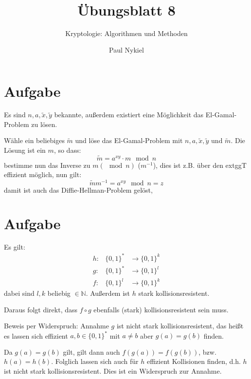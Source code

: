 \documentclass[DIN, pagenumber=false, fontsize=11pt, parskip=half]{scrartcl}
\title{Übungsblatt 8}
\subtitle{Kryptologie: Algorithmen und Methoden}
\author{Paul Nykiel}
\begin{document}
    \maketitle
    \section{Aufgabe}
    Es sind $n, a, \tilde{x}, \tilde{y}$ bekannte, außerdem existiert eine
    Möglichkeit das El-Gamal-Problem zu lösen.

    Wähle ein beliebiges $\tilde{m}$ und löse das El-Gamal-Problem mit
    $n, a, \tilde{x}, \tilde{y}$ und $\tilde{m}$. Die Lösung ist ein $m$, so
    dass:
    \begin{equation}
        \tilde{m} = a^{x y} \cdot m \mod n
    \end{equation}
    bestimme nun das Inverse zu $m (\mod n)$ ($m^{-1}$), dies ist z.B. über den extggT effizient
    möglich, nun gilt:
    \begin{equation}
        \tilde{m} m^{-1} = a^{x y} \mod n = z
    \end{equation}
    damit ist auch das Diffie-Hellman-Problem gelöst, 

    \section{Aufgabe}
    Es gilt:
    \begin{eqnarray}
        h: &\{0, 1\}^* &\to \{0, 1\}^k \\
        g: &\{0, 1\}^* &\to \{0, 1\}^l \\
        f: &\{0, 1\}^l &\to \{0, 1\}^k
    \end{eqnarray}
    dabei sind $l, k$ beliebig $\in \mathbb{N}$. 
    Außerdem ist $h$ stark kollisionsresistent.

    Daraus folgt direkt, dass $f \circ g$ ebenfalls (stark) kollisionsresistent sein
    muss.

    Beweis per Widerspruch: Annahme $g$ ist nicht stark kollisionsresistent,
    das heißt es lassen sich effizient $a, b \in \{0, 1\}^*$ mit $a \neq b$ aber
    $g(a) = g(b)$ finden.

    Da $g(a) = g(b)$ gilt, gilt dann auch $f(g(a)) = f(g(b))$, bzw. $h(a) = h(b)$.
    Folglich lassen sich auch für $h$ effizient Kollisionen finden, d.h. 
    $h$ ist nicht stark kollisionsresistent. Dies ist ein Widerspruch zur Annahme.
\end{document}
